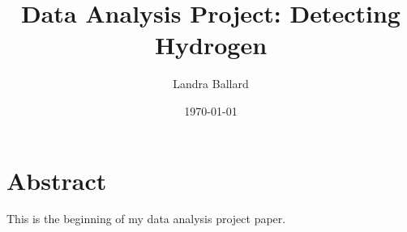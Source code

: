 \documentclass{article}
\author{Landra Ballard}
\title{Data Analysis Project: Detecting Hydrogen}
\date{\today}
\begin{document}
\maketitle

\section*{Abstract}

This is the beginning of my data analysis project paper.
\end{document}
